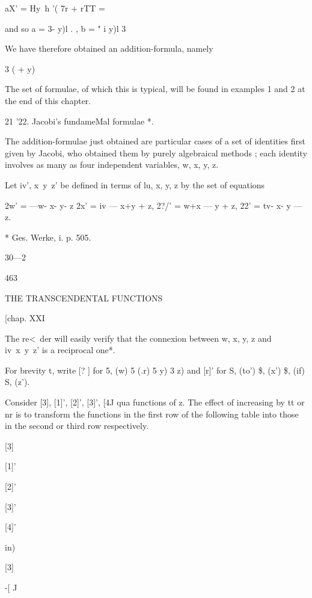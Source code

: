aX' =  Hy\ h  '( 7r +  rTT  = %

and so a =  3-  y)l . , b = " i   y)l 3\ 

We have therefore obtained an addition-formula, namely 

 3 (  + y) %

The set of formulae, of which this is typical, will be found in examples 1 
and 2 at the end of this chapter. 

21 '22. Jacobi's fundameMal formulae *. 

The addition-formulae just obtained are particular cases of a set of identities first given 
by Jacobi, who obtained them by purely algebraical methods ; each identity involves as 
many as four independent variables, w, x, y, z. 

Let iv', x\ y\ z' be defined in terms of lu, x, y, z by the set of equations 

2w' = —w- x- y- z  
2x' = iv — x+y + z, 
2?/' = w+x — y + z, 
22' = tv- x- y — z. 

* Ges. Werke, i. p. 505. 

30—2 



463 



THE TRANSCENDENTAL FUNCTIONS 



[chap. XXI 



The re<\ der will easily verify that the connexion between w, x, y, z and iv\ x\ y\ z' is a 
reciprocal one*. 

For brevity t, write [? ] for 5, (w) 5  (.r) 5   y) 3   z) and [r]' for S, (to') \$, (x') \$, (if) S, (z'). 

Consider [3], [1]', [2]', [3]', [4J qua functions of z. The effect of increasing   by tt or nr 
is to transform the functions in the first row of the following table into those in the second 
or third row respectively. 





[3] 


[1]' 


[2]' 


[3]' 


[4]' 


in) 


[3] 


-[ J 


